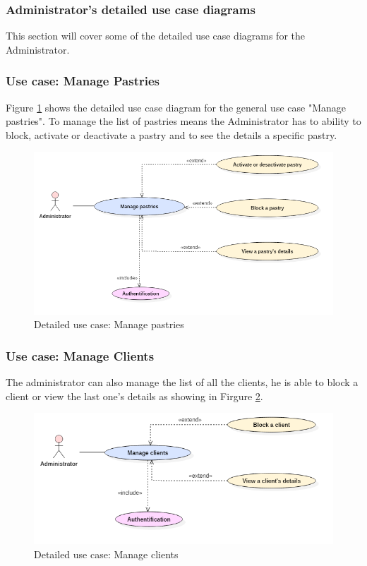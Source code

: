 \documentclass[12pt,a4paper]{report}
\begin{document}
		\subsubsection{Administrator's detailed use case diagrams}
		This section will cover some of the detailed use case diagrams for the Administrator.
			\subsubsection*{Use case: Manage Pastries}
			Figure \ref{user-case-manage-pastries} shows the detailed use case diagram for the general use case "Manage pastries". To manage the list of pastries means the Administrator has to ability to block, activate or deactivate a pastry and to see the details a specific pastry.
		\begin{figure}[H]
			\centering
			\includegraphics[width=5in,keepaspectratio]{gererPats.png}
			\caption{Detailed use case: Manage pastries}
			\label{user-case-manage-pastries}
		\end{figure}
		\subsubsection*{Use case: Manage Clients}
		The administrator can also manage the list of all the clients, he is able to block a client or view the last one's details as showing in Firgure \ref{user-case-manage-clients}.
		\begin{figure}[H]
			\centering
			\includegraphics[width=5in,keepaspectratio]{gererClients.png}
			\caption{Detailed use case: Manage clients}
			\label{user-case-manage-clients}
		\end{figure}
\end{document}
